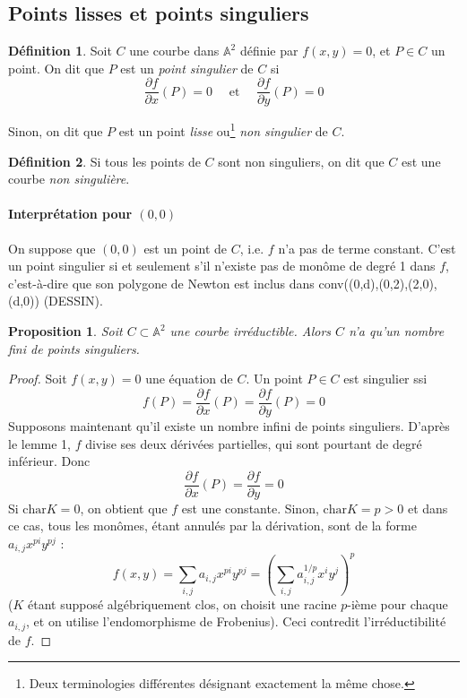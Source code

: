 \documentclass[a4paper, 11pt]{article}
\newtheorem{proposition}[théorème]{Proposition}
\theoremstyle{definition}
\newtheorem{définition}{Définition}
\newcommand{\aff}{\mathbb{A}}
\newcommand{\carac}{\textrm{char}}
\newcommand{\derivp}[2]{\dfrac{\partial #1}{\partial #2}}
\begin{document}
\subsection{Points lisses et points singuliers}

\begin{définition}
  Soit $C$ une courbe dans $\aff^2$ définie par $f(x,y)=0$, et
  $P \in C$ un point. On dit que $P$ est un \emph{point singulier} de $C$ si
  \[ \derivp{f}{x}(P) = 0 \quad\text{ et }\quad
  \derivp{f}{y}(P) = 0 \]

  Sinon, on dit que $P$ est un point \emph{lisse} ou\footnote{Deux
    terminologies différentes désignant exactement la même chose.}
  \emph{non singulier} de $C$.
\end{définition}
\begin{définition}
  Si tous les points de $C$ sont non singuliers, on dit que $C$ est
  une courbe \emph{non singulière}.
\end{définition}

\paragraph{Interprétation pour $(0,0)$} On suppose que $(0,0)$ est un
point de $C$, i.e. $f$ n'a pas de terme constant. C'est un point
singulier si et seulement s'il n'existe pas de monôme de degré 1 dans
$f$, c'est-à-dire que son polygone de Newton est inclus dans
conv((0,d),(0,2),(2,0),(d,0)) (DESSIN).

\begin{proposition}
  Soit $C \subset \aff^2$ une courbe irréductible. Alors $C$ n'a qu'un
  nombre fini de points singuliers.
\end{proposition}
\begin{proof}
  Soit $f(x,y)=0$ une équation de $C$. Un point $P \in C$ est singulier ssi
  \[ f(P) = \derivp{f}{x}(P) = \derivp{f}{y}(P) = 0 \]
  Supposons maintenant qu'il existe un nombre infini de points
  singuliers. D'après le lemme 1, $f$ divise ses deux dérivées
  partielles, qui sont pourtant de degré inférieur. Donc
  \[ \derivp{f}{x}(P) = \derivp{f}{y} = 0 \]
  Si $\carac K = 0$, on obtient que $f$ est une constante. Sinon,
  $\carac K = p > 0$ et dans ce cas, tous les monômes, étant annulés
  par la dérivation, sont de la forme $a_{i,j}x^{pi}y^{pj}$ :
  \[ f(x, y) = \sum_{i,j} a_{i,j}x^{pi}y^{pj} = \left(\sum_{i,j}
    a_{i,j}^{1/p}x^{i}y^{j}\right)^p \]
  ($K$ étant supposé algébriquement clos, on choisit une racine
  $p$-ième pour chaque $a_{i,j}$, et on utilise l'endomorphisme de
  Frobenius). Ceci contredit l'irréductibilité de $f$.
\end{proof}
\end{document}
